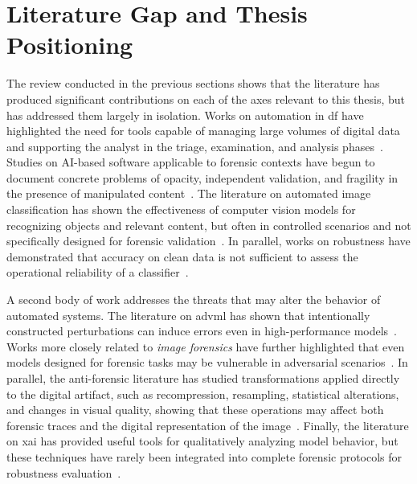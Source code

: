 \section{Literature Gap and Thesis Positioning}
\label{sec:sota-gap}

The review conducted in the previous sections shows that the literature has
produced significant contributions on each of the axes relevant to this thesis,
but has addressed them largely in isolation. Works on automation in \gls{df}
have highlighted the need for tools capable of managing large volumes of digital
data and supporting the analyst in the triage, examination, and analysis
phases~\cite{garfinkel2010digital,costantini2019digital,faqir2023digital}.
Studies on AI-based software applicable to forensic contexts have begun to
document concrete problems of opacity, independent validation, and fragility in
the presence of manipulated content~\cite{sanna2024preliminary,sanna2025pixelperfect}.
The literature on automated image classification has shown the effectiveness of
computer vision models for recognizing objects and relevant content, but often
in controlled scenarios and not specifically designed for forensic
validation~\cite{Hao2018DeepFirearm,he2016deep,tan2019efficientnet,radford2021learning,li2022blip}.
In parallel, works on robustness have demonstrated that accuracy on clean data
is not sufficient to assess the operational reliability of a
classifier~\cite{hendrycks2019benchmarking,hendrycks2017baseline,fort2021exploring,croce2020robustbench}.

A second body of work addresses the threats that may alter the behavior of
automated systems. The literature on \gls{advml} has shown that intentionally
constructed perturbations can induce errors even in high-performance
models~\cite{szegedy2014intriguing,goodfellow2015explaining,papernot2016limitations,carlini2017towards,biggio2018wild}.
Works more closely related to \textit{image forensics} have further highlighted
that even models designed for forensic tasks may be vulnerable in adversarial
scenarios~\cite{barni2018cf,nowroozi2020phd}. In parallel, the anti-forensic
literature has studied transformations applied directly to the digital
artifact, such as recompression, resampling, statistical alterations, and
changes in visual quality, showing that these operations may affect both
forensic traces and the digital representation of the
image~\cite{stamm2010anti,stamm2013information,farid2016photo,popescu2005exposing}.
Finally, the literature on \gls{xai} has provided useful tools for qualitatively
analyzing model behavior, but these techniques have rarely been integrated into
complete forensic protocols for robustness evaluation~\cite{Adadi2018,Doshi-Velez2017,Ribeiro2016,Sundararajan2017,Zhou2016}.

